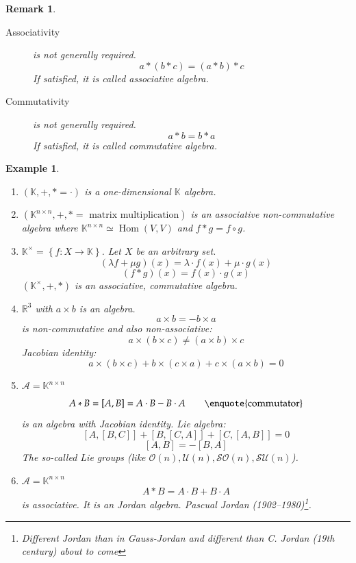 \documentclass{article}
\newtheorem{example}{Example}  \numberwithin{example}{section}
\newtheorem{remark}{Remark}  \numberwithin{remark}{section}
\newcommand{\set}[1]{\left\{#1\right\}}
\DeclareMathOperator{\Hom}{Hom}
\begin{document}
\begin{remark} %
  \begin{description}
    \item[Associativity] is not generally required.
      \[ a * (b * c) = (a * b) * c \]
      If satisfied, it is called \emph{associative algebra}.
    \item[Commutativity] is not generally required.
      \[ a * b = b * a \]
      If satisfied, it is called \emph{commutative algebra}.
  \end{description}
\end{remark}

\begin{example} %
  \begin{enumerate}
    \item $(\mathbb K, +, * = \cdot)$ is a one-dimensional $\mathbb K$ algebra.
    \item $(\mathbb K^{n \times n}, +, * = \text{ matrix multiplication})$ is an associative non-commutative algebra
      where $\mathbb K^{n \times n} \simeq \Hom(V, V)$ and $f * g = f \circ g$.
    \item $\mathbb K^\times = \set{f: X \to \mathbb K}$. Let $X$ be an arbitrary set.
      \[ (\lambda f + \mu g)(x) = \lambda \cdot f(x) + \mu \cdot g(x) \]
      \[ (f * g)(x) = f(x) \cdot g(x) \]
      $(\mathbb K^\times, +, *)$ is an associative, commutative algebra.
    \item $\mathbb R^3$ with $a \times b$ is an algebra.
      \[ a \times b = -b \times a \]
      is non-commutative and also non-associative:
      \[ a \times (b \times c) \neq (a \times b) \times c \]
      Jacobian identity:
      \[ a \times (b \times c) + b \times (c \times a) + c \times (a \times b) = 0 \]
    \item $\mathcal A = \mathbb K^{n\times n}$
      \[ A * B = [A,B] = A \cdot B - B \cdot A \qquad \text{\enquote{commutator}} \]
      is an algebra with Jacobian identity. Lie algebra:
      \[ [A, [B,C]] + [B, [C,A]] + [C, [A,B]] = 0 \]
      \[ [A,B] = -[B,A] \]
      The so-called Lie groups (like $\mathcal O(n), \mathcal U(n), \mathcal{SO}(n), \mathcal{SU}(n)$).
    \item
      $\mathcal A = \mathbb K^{n\times n}$
      \[ A * B = A \cdot B + B \cdot A \]
      is associative. It is an Jordan algebra.
      Pascual Jordan (1902--1980)\footnote{Different Jordan than in Gauss-Jordan and different than C. Jordan (19th century) about to come}.
  \end{enumerate}
\end{example}
\end{document}
